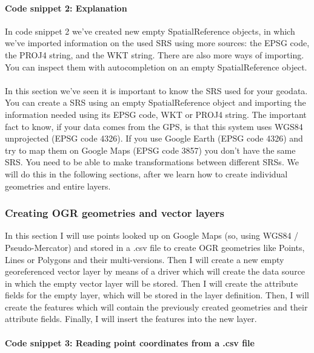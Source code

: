 \documentclass {article}
\begin{document}
\paragraph{Code snippet 2: Explanation}
In code snippet 2 we've created new empty SpatialReference objects, in which we've imported information on the used SRS using more sources: the EPSG code, the PROJ4 string, and the WKT string. There are also more ways of importing. You can inspect them with autocompletion on an empty SpatialReference object. 
\\
\\
In this section we've seen it is important to know the SRS used for your geodata. You can create a SRS using an empty SpatialReference object and importing the information needed using its EPSG code, WKT or PROJ4 string.
 The important fact to know, if your data comes from the GPS, is that this system uses WGS84 unprojected (EPSG code 4326). If you use Google Earth (EPSG code 4326) and try to map them on Google Maps (EPSG code 3857) you don't have the same SRS. You need to be able to make transformations between different SRSs. We will do this in the following sections, after we learn how to create individual geometries and entire layers.

\subsubsection {Creating OGR geometries and vector layers}

In this section I will use points looked up on Google Maps (so, using WGS84 / Pseudo-Mercator) and stored in a .csv file to create OGR geometries like Points, Lines or Polygons and their multi-versions. 
Then I will create a new empty georeferenced vector layer by means of a driver which will create the data source in which the empty vector layer will be stored. 
Then I will create the attribute fields for the empty layer, which will be stored in the layer definition.
 Then, I will create the features which will contain the previously created geometries and their attribute fields.
Finally, I will insert the features into the new layer. 

\paragraph {Code snippet 3: Reading point coordinates from a .csv file}
\end{document}
